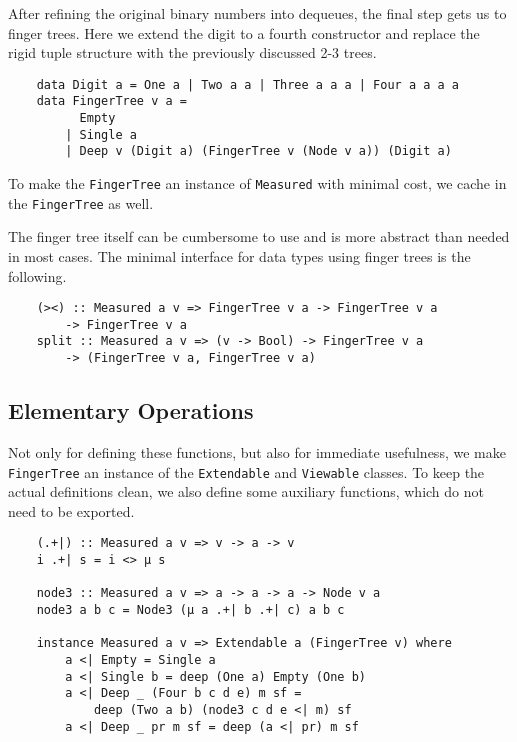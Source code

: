 After refining the original binary numbers into dequeues, the final step gets us to finger trees. Here we extend the digit to a fourth constructor and replace the rigid tuple structure with the previously discussed 2-3 trees.

\begin{verbatim}
    data Digit a = One a | Two a a | Three a a a | Four a a a a
    data FingerTree v a =
          Empty
        | Single a
        | Deep v (Digit a) (FingerTree v (Node v a)) (Digit a)
\end{verbatim}

To make the \texttt{FingerTree} an instance of \texttt{Measured} with minimal cost, we cache in the \texttt{FingerTree} as well.\par
The finger tree itself can be cumbersome to use and is more abstract than needed in most cases. The minimal interface for data types using finger trees is the following.

\begin{verbatim}
    (><) :: Measured a v => FingerTree v a -> FingerTree v a
        -> FingerTree v a
    split :: Measured a v => (v -> Bool) -> FingerTree v a
        -> (FingerTree v a, FingerTree v a)
\end{verbatim}

\subsection{Elementary Operations}

Not only for defining these functions, but also for immediate usefulness, we make \texttt{FingerTree} an instance of the \texttt{Extendable} and \texttt{Viewable} classes. To keep the actual definitions clean, we also define some auxiliary functions, which do not need to be exported.

\begin{verbatim}
    (.+|) :: Measured a v => v -> a -> v
    i .+| s = i <> μ s

    node3 :: Measured a v => a -> a -> a -> Node v a
    node3 a b c = Node3 (μ a .+| b .+| c) a b c

    instance Measured a v => Extendable a (FingerTree v) where
        a <| Empty = Single a
        a <| Single b = deep (One a) Empty (One b)
        a <| Deep _ (Four b c d e) m sf =
            deep (Two a b) (node3 c d e <| m) sf
        a <| Deep _ pr m sf = deep (a <| pr) m sf
\end{verbatim}


